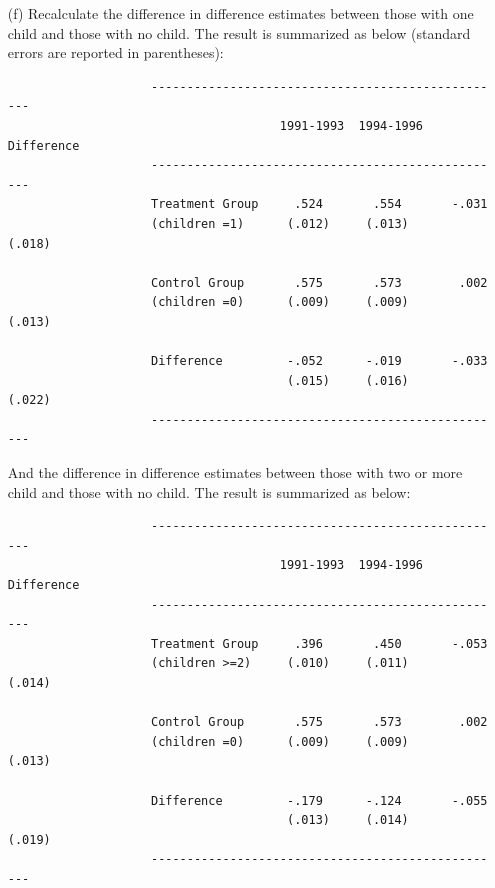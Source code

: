 \documentclass{article}
\begin{document}
\begin{enumerate}
\item[(f)] Recalculate the difference in difference estimates between those with one child and 
those with no child. The result is summarized as below (standard errors are reported in parentheses):

                \begin{verbatim}
                    --------------------------------------------------
                                      1991-1993  1994-1996  Difference
                    --------------------------------------------------
                    Treatment Group     .524       .554       -.031
                    (children =1)      (.012)     (.013)      (.018)
                                       
                    Control Group       .575       .573        .002
                    (children =0)      (.009)     (.009)      (.013)
                                       
                    Difference         -.052      -.019       -.033
                                       (.015)     (.016)      (.022)
                    --------------------------------------------------
                \end{verbatim}

And the difference in difference estimates between those with two or more child and 
those with no child. The result is summarized as below:

                \begin{verbatim}
                    --------------------------------------------------
                                      1991-1993  1994-1996  Difference
                    --------------------------------------------------
                    Treatment Group     .396       .450       -.053
                    (children >=2)     (.010)     (.011)      (.014)
                                       
                    Control Group       .575       .573        .002
                    (children =0)      (.009)     (.009)      (.013)
                                       
                    Difference         -.179      -.124       -.055
                                       (.013)     (.014)      (.019)
                    --------------------------------------------------
                \end{verbatim}
                

\end{enumerate}
\end{document}
